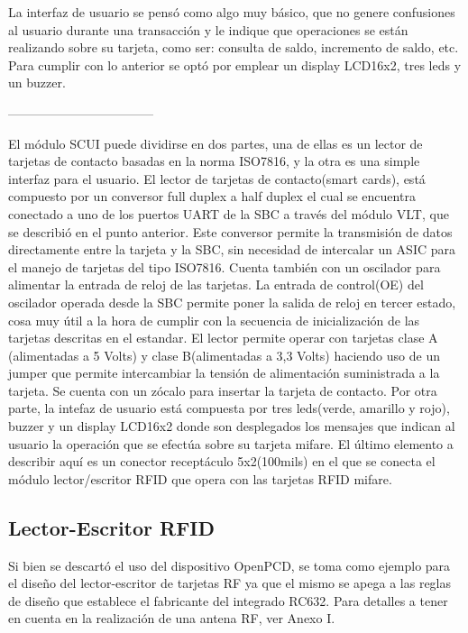 La interfaz de usuario se pensó como algo muy básico, que no genere confusiones al usuario durante una transacción y le indique que operaciones se están realizando sobre su tarjeta, como ser: consulta de saldo, incremento de saldo, etc. Para cumplir con lo anterior se optó por emplear un display LCD16x2, tres leds y un buzzer.

\bigskip
-----------------------------------
\bigskip

El módulo SCUI puede dividirse en dos partes, una de ellas es un lector de tarjetas de contacto basadas en la norma ISO7816, y la otra es una simple interfaz para el usuario.
El lector de tarjetas de contacto(smart cards), está compuesto por un conversor full duplex a half duplex el cual se encuentra conectado a uno de los puertos UART de la SBC a través del módulo VLT, que se describió en el punto anterior. Este conversor permite la transmisión de datos directamente entre la tarjeta y la SBC, sin necesidad de intercalar un ASIC para el manejo de tarjetas del tipo ISO7816. Cuenta también con un oscilador para alimentar la entrada de reloj de las tarjetas. La entrada de control(OE) del oscilador operada desde la SBC permite poner la salida de reloj en tercer estado, cosa muy útil a la hora de cumplir con la secuencia de inicialización de las tarjetas descritas en el estandar. El lector permite operar con tarjetas clase A (alimentadas a 5 Volts) y clase B(alimentadas a 3,3 Volts) haciendo uso de un jumper que permite intercambiar la tensión de alimentación suministrada a la tarjeta. Se cuenta con un zócalo para insertar la tarjeta de contacto.
Por otra parte, la intefaz de usuario está compuesta por tres leds(verde, amarillo y rojo), buzzer y un display LCD16x2 donde son desplegados los mensajes que indican al usuario la operación que se efectúa sobre su tarjeta mifare.
El último elemento a describir aquí es un conector receptáculo 5x2(100mils) en el que se conecta el módulo lector/escritor RFID que opera con las tarjetas RFID mifare.

\subsection{Lector-Escritor RFID}
Si bien se descartó el uso del dispositivo OpenPCD, se toma como ejemplo para el
diseño del lector-escritor de tarjetas RF ya que el mismo se apega a las reglas de
diseño que establece el fabricante del integrado RC632.
Para detalles a tener en cuenta en la realización de una antena RF, ver Anexo I.

